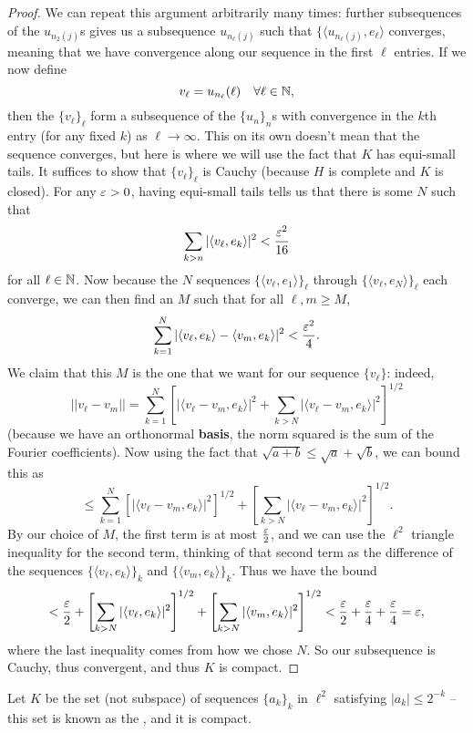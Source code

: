 \begin{proof}
We can repeat this argument arbitrarily many times: further subsequences of the $u_{n_2(j)}$s gives us a subsequence $u_{n_\ell(j)}$ such that $\{\langle u_{n_\ell(j)}, e_\ell \rangle$ converges, meaning that we have convergence along our sequence in the first $\ell$ entries. If we now define
\[
    v_\ell = u_{n_\ell}(\ell) \quad \forall \ell \in \mathbb N,
\]  
then the $\{v_\ell\}_\ell$ form a subsequence of the $\{u_n\}_n$s with convergence in the $k$th entry (for any fixed $k$) as $\ell \to \infty$. This on its own doesn't mean that the sequence converges, but here is where we will use the fact that $K$ has equi-small tails. It suffices to show that $\{v_\ell\}_{\ell}$ is Cauchy (because $H$ is complete and $K$ is closed). For any $\varepsilon > 0$, having equi-small tails tells us that there is some $N$ such that 
\[
    \sum_{k > n} |\langle v_\ell, e_k \rangle|^2 < \frac{\varepsilon^2}{16}
\]
for all $\ell \in \mathbb N$. Now because the $N$ sequences $\{\langle v_\ell, e_1 \rangle\}_\ell$ through $\{\langle v_\ell, e_N \rangle\}_\ell$ each converge, we can then find an $M$ such that for all $\ell, m \ge M$, 
\[
    \sum_{k=1}^N |\langle v_\ell, e_k \rangle - \langle v_m, e_k \rangle|^2 < \frac{\varepsilon^2}{4}.
\]
We claim that this $M$ is the one that we want for our sequence $\{v_\ell\}$: indeed, 
\[
    ||v_\ell - v_m|| = \sum_{k=1}^N \left[|\langle v_\ell - v_m, e_k \rangle|^2 + \sum_{k>N} |\langle v_\ell - v_m, e_k \rangle|^2\right]^{1/2}
\]
(because we have an orthonormal \textbf{basis}, the norm squared is the sum of the Fourier coefficients). Now using the fact that $\sqrt{a+b} \le \sqrt{a} + \sqrt{b}$, we can bound this as 
\[
    \le \sum_{k=1}^N \left[|\langle v_\ell - v_m, e_k \rangle|^2\right]^{1/2} + \left[\sum_{k>N} |\langle v_\ell - v_m, e_k \rangle|^2\right]^{1/2}.
\]
By our choice of $M$, the first term is at most $\frac{\varepsilon}{2}$, and we can use the $\ell^2$ triangle inequality for the second term, thinking of that second term as the difference of the sequences $\{\langle v_\ell, e_k \rangle\}_k$ and $\{\langle v_m, e_k \rangle\}_k$. Thus we have the bound
\[
    < \frac{\varepsilon}{2} + \left[\sum_{k>N} |\langle v_\ell, e_k \rangle|^2\right]^{1/2} + \left[\sum_{k>N} |\langle v_m, e_k \rangle|^2\right]^{1/2} < \frac{\varepsilon}{2} + \frac{\varepsilon}{4} + \frac{\varepsilon}{4} = \varepsilon,
\]
where the last inequality comes from how we chose $N$. So our subsequence is Cauchy, thus convergent, and thus $K$ is compact. 
\end{proof}

\begin{example}
Let $K$ be the set (not subspace) of sequences $\{a_k\}_k$ in $\ell^2$ satisfying $|a_k| \le 2^{-k}$ -- this set is known as the , and it is compact. 
\end{example}

